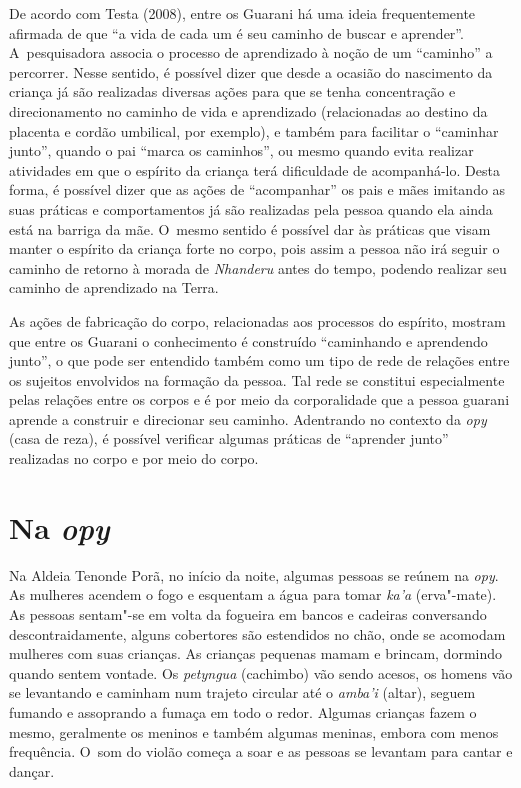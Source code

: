 De acordo com Testa (2008), entre os Guarani há uma ideia frequentemente
afirmada de que ``a vida de cada um é seu caminho de buscar e aprender''.
A~pesquisadora associa o processo de aprendizado à noção de um ``caminho''
a percorrer. Nesse sentido, é possível dizer que desde a ocasião do
nascimento da criança já são realizadas diversas ações para que se
tenha concentração e direcionamento no caminho de vida e aprendizado
(relacionadas ao destino da placenta e cordão umbilical, por exemplo),
e também para facilitar o ``caminhar junto'', quando o pai ``marca os
caminhos'', ou mesmo quando evita realizar atividades em que o espírito
da criança terá dificuldade de acompanhá-lo. Desta forma, é possível
dizer que as ações de ``acompanhar'' os pais e mães imitando as suas
práticas e comportamentos já são realizadas pela pessoa quando ela
ainda está na barriga da mãe. O~mesmo sentido é possível dar às
práticas que visam manter o espírito da criança forte no corpo, pois
assim a pessoa não irá seguir o caminho de retorno à morada de \emph{Nhanderu}
antes do tempo, podendo realizar seu caminho de aprendizado na Terra. 

As ações de fabricação do corpo, relacionadas aos processos do espírito,
mostram que entre os Guarani o conhecimento é construído ``caminhando e
aprendendo junto'', o que pode ser entendido também como um tipo de rede
de relações entre os sujeitos envolvidos na formação da pessoa. Tal
rede se constitui especialmente pelas relações entre os corpos e é por
meio da corporalidade que a pessoa guarani aprende a construir e
direcionar seu caminho. Adentrando no contexto da \emph{opy} (casa de reza), é
possível verificar algumas práticas de ``aprender junto'' realizadas no
corpo e por meio do corpo.

\section{Na \emph{opy}}

Na Aldeia Tenonde Porã, no início da noite, algumas pessoas se reúnem na
\emph{opy}. As mulheres acendem o fogo e esquentam a água para tomar \emph{ka’a}
(erva"-mate). As pessoas sentam"-se em volta da fogueira em bancos e
cadeiras conversando descontraidamente, alguns cobertores são
estendidos no chão, onde se acomodam mulheres com suas crianças. As
crianças pequenas mamam e brincam, dormindo quando sentem vontade. Os
\emph{petyngua} (cachimbo) vão sendo acesos, os homens vão se levantando e
caminham num trajeto circular até o \emph{amba’i} (altar), seguem fumando e
assoprando a fumaça em todo o redor. Algumas crianças fazem o mesmo,
geralmente os meninos e também algumas meninas, embora com menos
frequência. O~som do violão começa a soar e as pessoas se levantam para
cantar e dançar. 

